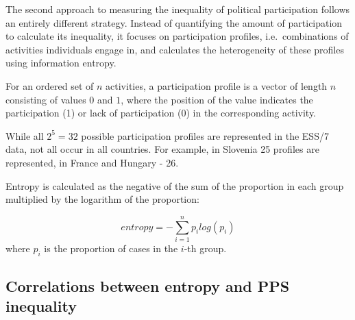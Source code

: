 \documentclass[12pt,]{article}
\begin{document}
The second approach to measuring the inequality of political participation follows an entirely different strategy. Instead of quantifying the amount of participation to calculate its inequality, it focuses on participation profiles, i.e.~combinations of activities individuals engage in, and calculates the heterogeneity of these profiles using information entropy.

For an ordered set of \(n\) activities, a participation profile is a vector of length \(n\) consisting of values \(0\) and \(1\), where the position of the value indicates the participation (1) or lack of participation (0) in the corresponding activity.

\begin{table}[H]

\caption{\label{tab:ess-part-profile}Creating participation profiles, example.}
\centering
{}
\end{table}

While all \(2^5=32\) possible participation profiles are represented in the ESS/7 data, not all occur in all countries. For example, in Slovenia 25 profiles are represented, in France and Hungary - 26.

Entropy is calculated as the negative of the sum of the proportion in each group multiplied by the logarithm of the proportion:

\[ entropy =-\sum_{i=1}^{n} p_i log(p_i) \]
where \(p_i\) is the proportion of cases in the \(i\)-th group.

\hypertarget{correlations-between-entropy-and-pps-inequality}{%
\subsection{Correlations between entropy and PPS inequality}\label{correlations-between-entropy-and-pps-inequality}}
\end{document}
